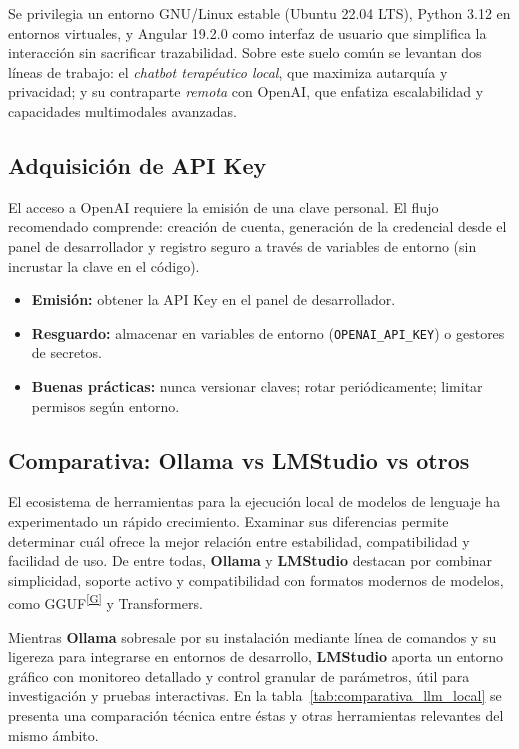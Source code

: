 \documentclass[12pt,a4paper]{report}
\numberwithin{figure}{section}
\begin{document}
Se privilegia un entorno GNU/Linux estable (Ubuntu 22.04 LTS), Python 3.12 en entornos virtuales, y Angular 19.2.0 como interfaz de usuario que simplifica la interacción sin sacrificar trazabilidad. Sobre este suelo común se levantan dos líneas de trabajo: el \textit{chatbot terapéutico local}, que maximiza autarquía y privacidad; y su contraparte \textit{remota} con OpenAI, que enfatiza escalabilidad y capacidades multimodales avanzadas.

\subsection{Adquisición de API Key}
\label{subsec:api_key}

El acceso a OpenAI requiere la emisión de una clave personal. El flujo recomendado comprende: creación de cuenta, generación de la credencial desde el panel de desarrollador y registro seguro a través de variables de entorno (sin incrustar la clave en el código).
\begin{itemize}
    \item \textbf{Emisión:} obtener la API Key en el panel de desarrollador.
    \item \textbf{Resguardo:} almacenar en variables de entorno (\texttt{OPENAI\_API\_KEY}) o gestores de secretos.
    \item \textbf{Buenas prácticas:} nunca versionar claves; rotar periódicamente; limitar permisos según entorno.
\end{itemize}

\subsection{Comparativa: Ollama vs LMStudio vs otros}
\label{subsec:comparativa_herramientas}

El ecosistema de herramientas para la ejecución local de modelos de lenguaje ha experimentado un rápido crecimiento. Examinar sus diferencias permite determinar cuál ofrece la mejor relación entre estabilidad, compatibilidad y facilidad de uso. De entre todas, \textbf{Ollama} y \textbf{LMStudio} destacan por combinar simplicidad, soporte activo y compatibilidad con formatos modernos de modelos, como GGUF\textsuperscript{\hyperref[glos:gguf]{[G]}} y Transformers.  

Mientras \textbf{Ollama} sobresale por su instalación mediante línea de comandos y su ligereza para integrarse en entornos de desarrollo, \textbf{LMStudio} aporta un entorno gráfico con monitoreo detallado y control granular de parámetros, útil para investigación y pruebas interactivas. En la tabla~\ref{tab:comparativa_llm_local} se presenta una comparación técnica entre éstas y otras herramientas relevantes del mismo ámbito.
\end{document}
